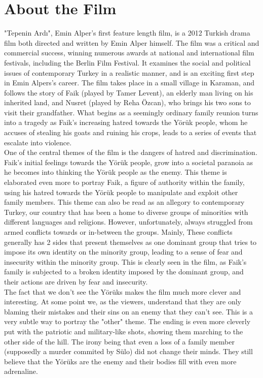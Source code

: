 \documentclass[12pt]{article}
\begin{document}
\section{About the Film}
\par
"Tepenin Ardı", Emin Alper's first feature length film, is a 2012 Turkish drama film both directed and written by Emin Alper himself. The film was a critical and commercial success, winning numerous awards at national and international film festivals, including the Berlin Film Festival. It examines the social and political issues of contemporary Turkey in a realistic manner, and is an exciting first step in Emin Alpers's career. The film takes place in a small village in Karaman, and follows the story of Faik (played by Tamer Levent), an elderly man living on his inherited land, and Nusret (played by Reha Özcan), who brings his two sons to visit their grandfather. What begins as a seemingly ordinary family reunion turns into a tragedy as Faik's increasing hatred towards the Yörük people, whom he accuses of stealing his goats and ruining his crops, leads to a series of events that escalate into violence.
\\
One of the central themes of the film is the dangers of hatred and discrimination. Faik's initial feelings towards the Yörük people, grow into a societal paranoia as he becomes into thinking the Yörük people as the enemy. This theme is elaborated even more to portray Faik, a figure of authority within the family, using his hatred towards the Yörük people to manipulate and exploit other family members. This theme can also be read as an allegory to contemporary Turkey, our country that has been a home to diverse groups of minorities with different languages and religions. However, unfortunately, always struggled from armed conflicts towards or in-between the groups. Mainly, These conflicts generally has 2 sides that present themselves as one dominant group that tries to impose its own identity on the minority group, leading to a sense of fear and insecurity within the minority group. This is clearly seen in the film, as Faik's family is subjected to a broken identity imposed by the dominant group, and their actions are driven by fear and insecurity.
\\
The fact that we don't see the Yörüks makes the film much more clever and interesting. At some point we, as the viewers, understand that they are only blaming their mistakes and their sins on an enemy that they can't see. This is a very subtle way to portray the "other" theme. The ending is even more cleverly put with the patriotic and military-like shots, showing them marching to the other side of the hill. The irony being that even a loss of a family member (supposedly a murder commited by Sülo) did not change their minds. They still believe that the Yörüks are the enemy and their bodies fill with even more adrenaline.
\end{document}

